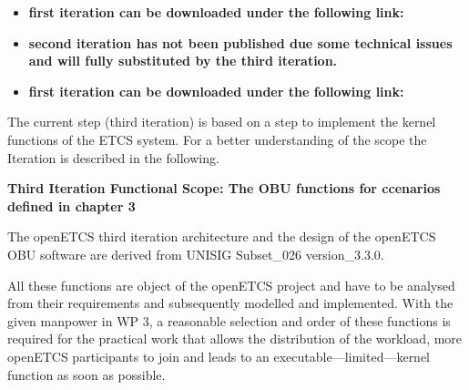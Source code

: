 \begin{itemize}
\item \textbf{first iteration can be downloaded under the following link:}
\end{itemize}


\begin{itemize}
\item \textbf{second iteration has not been published due some technical issues and will fully substituted by the third iteration.}
\end{itemize}

\begin{itemize}
\item \textbf{first iteration can be downloaded under the following link:}
\end{itemize}
The current step (third iteration) is based on a step to implement the kernel functions of the ETCS system. For a better understanding of the scope the Iteration is described in the following.

\textbf{Third Iteration Functional Scope: The OBU functions for ccenarios defined in chapter 3}

The openETCS third iteration architecture and the design of the openETCS OBU software are derived from \cite{subset-026} UNISIG Subset\_026 version\_3.3.0. 

All these functions are object of the openETCS project and have to be analysed from their requirements and subsequently modelled and implemented. With the given manpower in WP 3, a reasonable selection and order of these functions is required for the practical work that allows the distribution of the workload, more openETCS participants to join and leads to an executable---limited---kernel function as soon as possible. 


